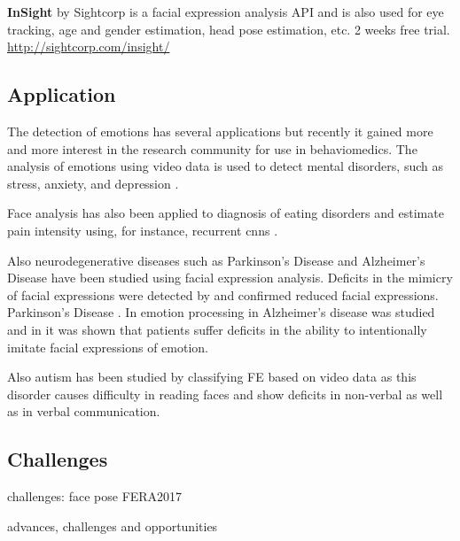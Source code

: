 \textbf{InSight} by Sightcorp is a facial expression analysis API and is also used for eye tracking, age and gender estimation, head pose estimation, etc. 2 weeks free trial.
\url{http://sightcorp.com/insight/}\\




\subsection{Application}

The detection of emotions has several applications but recently it gained more and more interest in the research community for use in \gls{behaviomedics}\cite{Valstar2014automatic}. The analysis of emotions using video data is used to detect mental disorders, such as stress, anxiety, and depression \cite{Holt2016,Valstar2014automatic,Valstar2016avec,Valstar2014avec}. 

Face analysis has also been applied to diagnosis of eating disorders \cite{Leppanen2017} and estimate pain intensity \cite{Valstar2014automatic} using, for instance, recurrent \glspl{cnn} \cite{Zhou2016}. 

Also neurodegenerative diseases such as Parkinson's Disease \cite{Almutiry2016,Bandini2017,Silverdale2016} and Alzheimer's Disease have been studied using facial expression analysis. Deficits in the mimicry of facial expressions were detected by \cite{Livingstone2016} and \cite{Ricciardi2015} confirmed reduced facial expressions.
Parkinson's Disease \cite{Almutiry2016,Bandini2017}. In \cite{Cadieux1997} 
emotion processing in Alzheimer's disease was studied and in \cite{Gola2017} it was shown that patients suffer deficits in the ability to intentionally imitate facial expressions of emotion.

Also autism has been studied by classifying FE based on video data \cite{Valstar2014automatic} as this disorder causes difficulty in reading faces and show deficits in non-verbal as well as in verbal communication.


\subsection{Challenges}
challenges: face pose FERA2017 \cite{Valstar2017}

 advances, challenges and opportunities \cite{Martinez2016}

